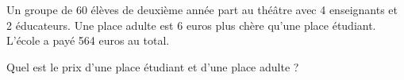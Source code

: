 %
%
    Un groupe de 60 élèves de deuxième année part au théâtre avec 4 enseignants
    et 2 éducateurs. Une place adulte est 6 euros plus chère qu’une place
    étudiant. L’école a payé 564 euros au total.\par
    Quel est le prix d’une place étudiant et d’une place adulte ?

